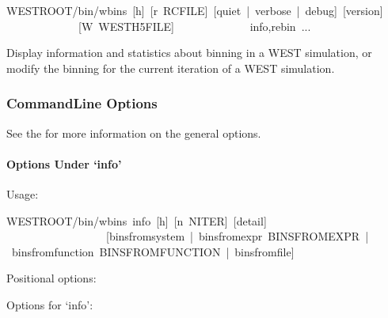 \documentclass[letterpaper,10pt,english]{sphinxmanual}
\begin{document}
\begin{sphinxVerbatim}[commandchars=\\\{\}]
\PYGZdl{}WEST\PYGZus{}ROOT/bin/w\PYGZus{}bins [\PYGZhy{}h] [\PYGZhy{}r RCFILE] [\PYGZhy{}\PYGZhy{}quiet | \PYGZhy{}\PYGZhy{}verbose | \PYGZhy{}\PYGZhy{}debug] [\PYGZhy{}\PYGZhy{}version]
             [\PYGZhy{}W WEST\PYGZus{}H5FILE]
             \PYGZob{}info,rebin\PYGZcb{} ...
\end{sphinxVerbatim}

Display information and statistics about binning in a WEST simulation, or
modify the binning for the current iteration of a WEST simulation.


\subsubsection{Command\sphinxhyphen{}Line Options}
\label{\detokenize{users_guide/command_line_tools/w_bins:command-line-options}}
See the  for
more information on the general options.


\paragraph{Options Under ‘info’}
\label{\detokenize{users_guide/command_line_tools/w_bins:options-under-info}}
Usage:

\begin{sphinxVerbatim}[commandchars=\\\{\}]
\PYGZdl{}WEST\PYGZus{}ROOT/bin/w\PYGZus{}bins info [\PYGZhy{}h] [\PYGZhy{}n N\PYGZus{}ITER] [\PYGZhy{}\PYGZhy{}detail]
                  [\PYGZhy{}\PYGZhy{}bins\PYGZhy{}from\PYGZhy{}system | \PYGZhy{}\PYGZhy{}bins\PYGZhy{}from\PYGZhy{}expr BINS\PYGZus{}FROM\PYGZus{}EXPR | \PYGZhy{}\PYGZhy{}bins\PYGZhy{}from\PYGZhy{}function BINS\PYGZus{}FROM\PYGZus{}FUNCTION | \PYGZhy{}\PYGZhy{}bins\PYGZhy{}from\PYGZhy{}file]
\end{sphinxVerbatim}

Positional options:

\begin{sphinxVerbatim}[commandchars=\\\{\}]
     
\end{sphinxVerbatim}

Options for ‘info’:
\end{document}
